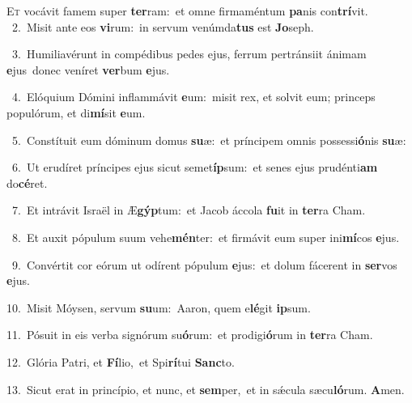 \lettrine{\initial\textcolor{\initialcolor}{E}}{t} vocávit famem super \textbf{ter}\-ram:~\star et omne firmaméntum \textbf{pa}\-nis con\-\textbf{trí}\-vit.\\
{\numbfont\textcolor{\numbcolor}{~2.}}~Misit ante eos \textbf{vi}\-rum:~\star in servum venúmda\textbf{tus} est \textbf{Jo}\-seph.\par
{\numbfont\textcolor{\numbcolor}{~3.}}~Humiliavérunt in compédibus pedes ejus, ferrum pertránsiit ánimam \textbf{e}\-jus~\star donec veníret \textbf{ver}\-bum \textbf{e}\-jus.\par
{\numbfont\textcolor{\numbcolor}{~4.}}~Elóquium Dómini inflammávit \textbf{e}\-um:~\star misit rex, et solvit eum; princeps populórum, et di\-\textbf{mí}\-sit \textbf{e}\-um.\par
{\numbfont\textcolor{\numbcolor}{~5.}}~Constítuit eum dóminum domus \textbf{su}\-æ:~\star et príncipem omnis possessi\-\textbf{ó}\-nis \textbf{su}\-æ:\par
{\numbfont\textcolor{\numbcolor}{~6.}}~Ut erudíret príncipes ejus sicut semet\-\textbf{íp}\-sum:~\star et senes ejus prudénti\textbf{am} do\-\textbf{cé}\-ret.\par
{\numbfont\textcolor{\numbcolor}{~7.}}~Et intrávit Israël in Æ\-\textbf{gýp}\-tum:~\star et Jacob áccola \textbf{fu}\-it in \textbf{ter}\-ra Cham.\par
{\numbfont\textcolor{\numbcolor}{~8.}}~Et auxit pópulum suum vehe\-\textbf{mén}\-ter:~\star et firmávit eum super ini\-\textbf{mí}\-cos \textbf{e}\-jus.\par
{\numbfont\textcolor{\numbcolor}{~9.}}~Convértit cor eórum ut odírent pópulum \textbf{e}\-jus:~\star et dolum fácerent in \textbf{ser}\-vos \textbf{e}\-jus.\par
{\numbfont\textcolor{\numbcolor}{10.}}~Misit Móysen, servum \textbf{su}\-um:~\star Aaron, quem e\-\textbf{lé}\-git \textbf{ip}\-sum.\par
{\numbfont\textcolor{\numbcolor}{11.}}~Pósuit in eis verba signórum su\-\textbf{ó}\-rum:~\star et prodigi\-\textbf{ó}\-rum in \textbf{ter}\-ra Cham.\par
{\numbfont\textcolor{\numbcolor}{12.}}~Glória Patri, et \textbf{Fí}\-lio,~\star et Spi\-\textbf{rí}\-tui \textbf{Sanc}\-to.\par
{\numbfont\textcolor{\numbcolor}{13.}}~Sicut erat in princípio, et nunc, et \textbf{sem}\-per,~\star et in sǽcula sæcu\-\textbf{ló}\-rum. \textbf{A}\-men.\par

